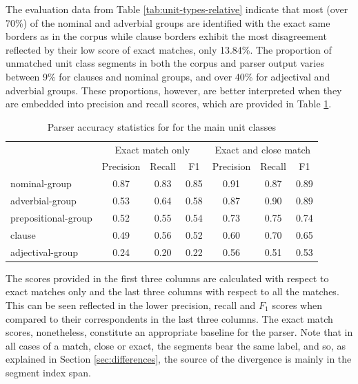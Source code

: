     The evaluation data from Table \ref{tab:unit-types-relative} indicate that most (over 70\%) of the nominal and adverbial groups are identified with the exact same borders as in the corpus while clause borders exhibit the most disagreement reflected by their low score of exact matches, only 13.84\%. The proportion of unmatched unit class segments in both the corpus and parser output varies between 9\% for clauses and nominal groups, and over 40\% for adjectival and adverbial groups. These proportions, however, are better interpreted when they are embedded into precision and recall scores, which are provided in Table  \ref{tab:unit-types-combined-F1}. 
    \begin{table}[!ht]
    \centering
    \begin{tabular}{lcccccc}
    \toprule
     & \multicolumn{3}{c}{Exact match only} & \multicolumn{3}{c}{Exact and close match} \\ \cline{2-7} 
     & Precision & Recall & F1 & Precision & Recall & F1 \\ 
    \midrule
    nominal-group & 0.87 & 0.83 & 0.85 & 0.91 & 0.87 & 0.89 \\
    adverbial-group & 0.53 & 0.64 & 0.58 & 0.87 & 0.90 & 0.89 \\
    prepositional-group & 0.52 & 0.55 & 0.54 & 0.73 & 0.75 & 0.74 \\
    clause & 0.49 & 0.56 & 0.52 & 0.60 & 0.70 & 0.65 \\
    adjectival-group & 0.24 & 0.20 & 0.22 & 0.56 & 0.51 & 0.53 \\ 
    \bottomrule
    \end{tabular}
    \caption{Parser accuracy statistics for for the main unit classes}
    \label{tab:unit-types-combined-F1}
    \end{table}
    
    The scores provided in the first three columns are calculated with respect to exact matches only and the last three columns with respect to all the matches. This can be seen reflected in the lower precision, recall and $F_1$ scores when compared to their correspondents in the last three columns. The exact match scores, nonetheless, constitute an appropriate baseline for the parser. Note that in all cases of a match, close or exact, the segments bear the same label, and so, as explained in Section \ref{sec:differences}, the source of the divergence is mainly in the segment index span. 
    
